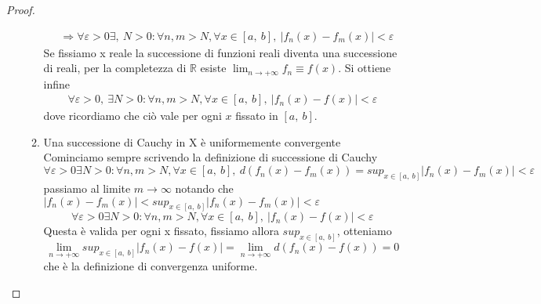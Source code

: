 \documentclass[10pt,a4paper]{article}
\newtheorem{proof}{Proof}
\begin{document}
\begin{proof}
\begin{itemize}
\begin{enumerate}
\begin{align*}
			&\Rightarrow \forall \varepsilon > 0 \exists,\ N>0 : \forall n,m >N,\forall x\in[a,\ b],\ |f_n(x) - f_m(x)| < \varepsilon
			\end{align*}
			Se fissiamo x reale la successione di funzioni reali diventa una successione di reali, per la completezza di $\mathbb{R}$ esiste \(\lim_{n\to+\infty}f_n\equiv f(x)\). Si ottiene infine
			\begin{align*}
				\forall \varepsilon > 0,\ \exists N>0 : \forall n,m >N,\forall x\in[a,\ b],\ |f_n(x) - f(x)| < \varepsilon
			\end{align*}
			dove ricordiamo che ciò vale per ogni \(x\) fissato in \([a,\ b]\).
			
			\item Una successione di Cauchy in X è uniformemente convergente\\
			Cominciamo sempre scrivendo la definizione di successione di Cauchy
			\[\forall \varepsilon > 0 \exists N>0 : \forall n,m >N, \forall x\in[a,\ b],\ d(f_n(x)-f_m(x)) = sup_{x\in[a,\ b]}|f_n(x) - f_m(x)| < \varepsilon\]
			passiamo al limite \(m\to\infty\) notando che \(|f_n(x) - f_m(x)|<sup_{x\in[a,\ b]}|f_n(x) - f_m(x)|<\varepsilon\)
			\[\forall \varepsilon > 0 \exists N>0 : \forall n,m >N, \forall x\in[a,\ b],\ |f_n(x) - f(x)| < \varepsilon\]
			Questa è valida per ogni x fissato, fissiamo allora \(sup_{x\in[a,\ b]}\), otteniamo
			\[\lim_{n\to+\infty}sup_{x\in[a,\ b]}|f_n(x) - f(x)|=\lim_{n\to+\infty}d(f_n(x)-f(x))=0\]
			che è la definizione di convergenza uniforme. 
			

\end{enumerate}
\end{itemize}
\end{proof}
\end{document}
